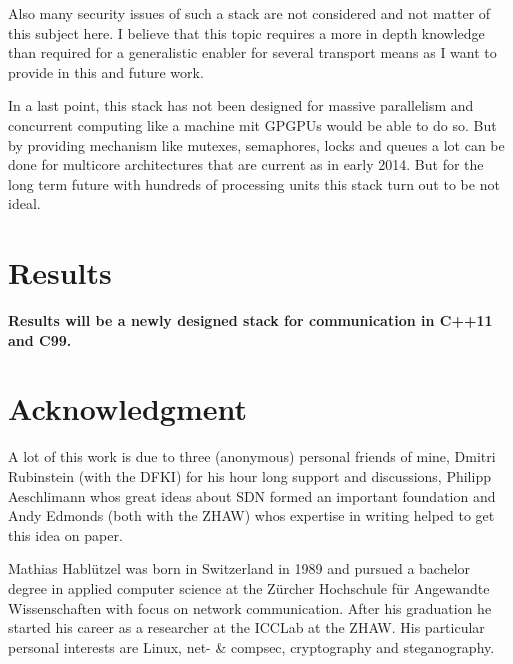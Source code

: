 \documentclass[twocolumn,english]{IEEEtran}
\theoremstyle{plain}
\theoremstyle{plain}
\begin{document}
Also many security issues of such a stack are not considered and not matter
of this subject here. I believe that this topic requires a more in depth
knowledge than required for a generalistic enabler for several transport
means as I want to provide in this and future work.

In a last point, this stack has not been designed for massive parallelism and
concurrent computing like a machine mit GPGPUs would be able to do so. But by
providing mechanism like mutexes, semaphores, locks and queues a lot can be
done for multicore architectures that are current as in early 2014. But for
the long term future with hundreds of processing units this stack turn out to
be not ideal.

\section{Results}

\textbf{Results will be a newly designed stack for communication in C++11 and
C99.}

\section*{Acknowledgment}

A lot of this work is due to three (anonymous) personal friends of mine, Dmitri
Rubinstein (with the DFKI) for his hour long support and discussions, Philipp
Aeschlimann whos great ideas about SDN formed an important foundation and
Andy Edmonds (both with the ZHAW) whos expertise in writing helped to get
this idea on paper.





\begin{IEEEbiography}
{Mathias Hablützel} was born in Switzerland in 1989 and pursued a bachelor
degree in applied computer science at the Zürcher Hochschule für Angewandte
Wissenschaften with focus on network communication. After his graduation he
started his career as a researcher at the ICCLab at the ZHAW. His particular
personal interests are Linux, net- \& compsec, cryptography and steganography.

\end{IEEEbiography}
\end{document}
